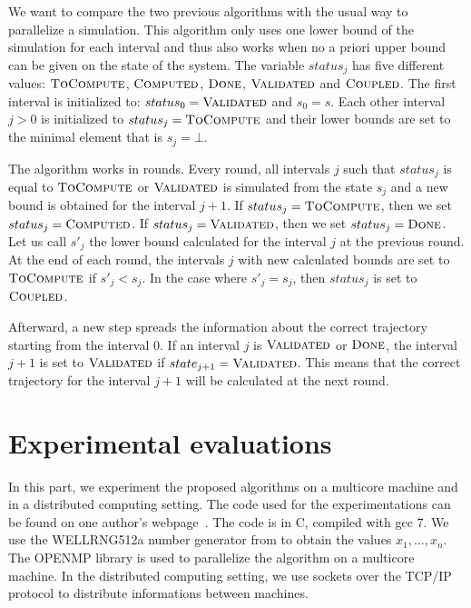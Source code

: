 \documentclass[a4paper,10pt]{article}
\begin{document}
We want to compare the two previous algorithms with the usual way to parallelize a simulation. 
This algorithm only uses one lower bound of the simulation for each interval and thus also works when no a priori upper bound can be given on the state of the system. The variable $status_j$ has five different values:  $\textsc{ToCompute}$,  $\textsc{Computed}$,  $\textsc{Done}$,  $\textsc{Validated}$ and $\textsc{Coupled}$.
The first interval is initialized to: $status_0 = \textsc{Validated}$ and $s_0 = s$.
Each other interval $j>0$ is initialized to $status_j = \textsc{ToCompute}$ and their lower bounds are set to the minimal element that is  $s_j = \bot$. 

The algorithm works in rounds. Every round, all intervals $j$ such that $status_j$ is equal to $\textsc{ToCompute}$ or $\textsc{Validated}$ is simulated from the state $s_j$ and a new bound is obtained for the interval $j+1$. If $status_j = \textsc{ToCompute}$, then  we set $status_j = \textsc{Computed}$. If $status_j = \textsc{Validated}$, then  we set $status_j = \textsc{Done}$.
 Let us call $s'_j$ the lower bound calculated for the interval $j$ at the previous round. At the end of each round, the intervals $j$ with new calculated bounds are set to $\textsc{ToCompute}$ if $s'_j < s_j$. In the case where $s'_j = s_j$, then $status_j$ is set to $\textsc{Coupled}$. 
 
Afterward, a new step spreads the information about the correct trajectory starting from the interval $0$. If an interval $j$ is $\textsc{Validated}$ or $\textsc{Done}$, the interval $j+1$ is set to $ \textsc{Validated}$ if $state_{j+1} = \textsc{Validated}$. This means that the correct trajectory for the interval $j+1$ will be calculated at the next round.

\section{Experimental evaluations}\label{sec:expertiments}

In this part, we experiment the proposed algorithms on a multicore machine and in a distributed computing setting. The code used for the experimentations can be found on one author's webpage~\cite{webpage}. The code is in C, compiled with gcc 7.
We use the WELLRNG512a number generator from \cite{panneton2006improved} to obtain the values $x_1,\dots,x_n$. 
The OPENMP library is used to parallelize the algorithm on a multicore machine. 
In the distributed computing setting, we use sockets over the TCP/IP protocol to distribute informations between machines.
\end{document}

